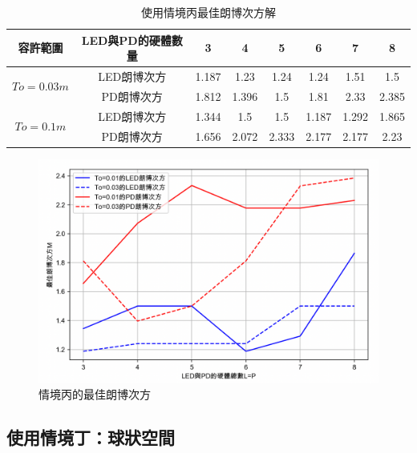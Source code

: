    \begin{table}[htpb]
        \begin{center}
          \caption{使用情境丙最佳朗博次方解}
          \label{tab:C_opt_m}
          \begin{tabular}{c|c||c|c|c|c|c|c} %
            容許範圍&LED與PD的硬體數量& 3&4&5&6&7&8\\
            \hline

            \multirow{2}{*}{$To=0.03m$}&LED朗博次方& 1.187&	1.23&	1.24	&1.24&	1.51	&1.5\\
            &PD朗博次方& 1.812&	1.396	&1.5&	1.81&	2.33	&2.385\\\hline
            
            \multirow{2}{*}{$To=0.1m$}&LED朗博次方&
            1.344&	1.5	&1.5&	1.187	&1.292&	1.865\\
            &PD朗博次方&1.656	&2.072	&2.333&	2.177	&2.177&	2.23
          \end{tabular}
        \end{center}
      \end{table}

    \begin{figure}[htpb]
        \centering
        \includegraphics[width=13cm]{ch5pic/c_opt_m.png}
        \caption{情境丙的最佳朗博次方}
        \label{pic:c_opt_m}
    \end{figure}

    


    \subsection{使用情境丁：球狀空間}
    \label{chp:optimiza_D}

